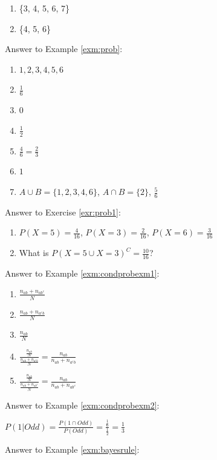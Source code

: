 \documentclass[]{book}
\providecommand{\tightlist}{%
  \setlength{\itemsep}{0pt}\setlength{\parskip}{0pt}}
\theoremstyle{definition}
\theoremstyle{definition}
\theoremstyle{definition}
\theoremstyle{remark}
\begin{document}
\begin{enumerate}
\def\labelenumi{\arabic{enumi}.}
\tightlist
\item
  \{3, 4, 5, 6, 7\}
\item
  \{4, 5, 6\}
\end{enumerate}

Answer to Example \ref{exm:prob}:

\begin{enumerate}
\def\labelenumi{\arabic{enumi}.}
\item
  \({1, 2, 3, 4, 5, 6}\)
\item
  \(\frac{1}{6}\)
\item
  \(0\)
\item
  \(\frac{1}{2}\)
\item
  \(\frac{4}{6} = \frac{2}{3}\)
\item
  \(1\)
\item
  \(A\cup B=\{1, 2, 3, 4, 6\}\), \(A\cap B=\{2\}\), \(\frac{5}{6}\)
\end{enumerate}

Answer to Exercise \ref{exr:prob1}:

\begin{enumerate}
\def\labelenumi{\arabic{enumi}.}
\item
  \(P(X = 5) = \frac{4}{16}\), \(P(X = 3) = \frac{2}{16}\), \(P(X = 6) = \frac{3}{16}\)
\item
  What is \(P(X=5 \cup X = 3)^C = \frac{10}{16}\)?
\end{enumerate}

Answer to Example \ref{exm:condprobexm1}:

\begin{enumerate}
\def\labelenumi{\arabic{enumi}.}
\item
  \(\frac{n_{ab} + n_{ab^c}}{N}\)
\item
  \(\frac{n_{ab} + n_{a^cb}}{N}\)
\item
  \(\frac{n_{ab}}{N}\)
\item
  \(\frac{\frac{n_{ab}}{N}}{\frac{n_{ab} + n_{a^cb}}{N}} = \frac{n_{ab}}{n_{ab} + n_{a^cb}}\)
\item
  \(\frac{\frac{n_{ab}}{N}}{\frac{n_{ab} + n_{ab^c}}{N}} = \frac{n_{ab}}{n_{ab} + n_{ab^c}}\)
\end{enumerate}

Answer to Example \ref{exm:condprobexm2}:

\(P(1|Odd) = \frac{P(1 \cap Odd)}{P(Odd)} = \frac{\frac{1}{6}}{\frac{1}{2}} = \frac{1}{3}\)

Answer to Example \ref{exm:bayesrule}:
\end{document}
